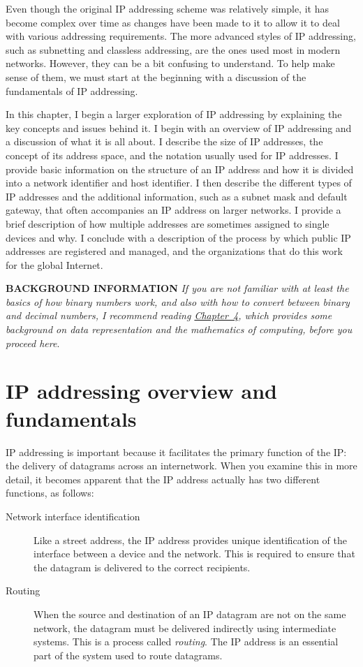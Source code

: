 \documentclass[b5paper,11pt]{memoir}
\begin{document}
Even though the original IP addressing scheme was relatively simple, it
has become complex over time as changes have been made to it to allow it
to deal with various addressing requirements. The more advanced styles
of IP addressing, such as subnetting and classless addressing, are the
ones used most in modern networks. However, they can be a bit confusing
to understand. To help make sense of them, we must start at the
beginning with a discussion of the fundamentals of IP addressing.

In this chapter, I begin a larger exploration of
\protect\hypertarget{ch16.htmlux5cux23idx-CHP-16-0646}{}{}IP addressing
by explaining the key concepts and issues behind it. I begin with an
overview of IP addressing and a discussion of what it is all about. I
describe the size of IP addresses, the concept of its address space, and
the notation usually used for IP addresses. I provide basic information
on the structure of an IP address and how it is divided into a network
identifier and host identifier. I then describe the different types of
IP addresses and the additional information, such as a subnet mask and
default gateway, that often accompanies an IP address on larger
networks. I provide a brief description of how multiple addresses are
sometimes assigned to single devices and why. I conclude with a
description of the process by which public IP addresses are registered
and managed, and the organizations that do this work for the global
Internet.

{\textbf{BACKGROUND INFORMATION}} {\emph{If you are not familiar with at
least the basics of how binary numbers work, and also with how to
convert between binary and decimal numbers, I recommend reading
\protect\hyperlink{ch04.html}{Chapter~4}, which provides some background
on data representation and the mathematics of computing, before you
proceed here}}.




\section{IP addressing overview and fundamentals}


IP addressing is important because it facilitates the primary function
of the IP: the delivery of datagrams across an internetwork. When you
examine this in more detail, it becomes apparent that the IP address
actually has two different functions, as follows:
\begin{description}
   \item[Network interface identification]
      Like a street address, the IP address provides unique identification of the interface between a device and the network.
      This is required to ensure that the datagram is delivered to the correct recipients.
   \item[Routing]
      When the source and destination of an IP datagram are not on the same network, the datagram must be delivered indirectly using intermediate systems.
      This is a process called \emph{routing}.
      The IP address is an essential part of the system used to route datagrams.
\end{description}
\end{document}
